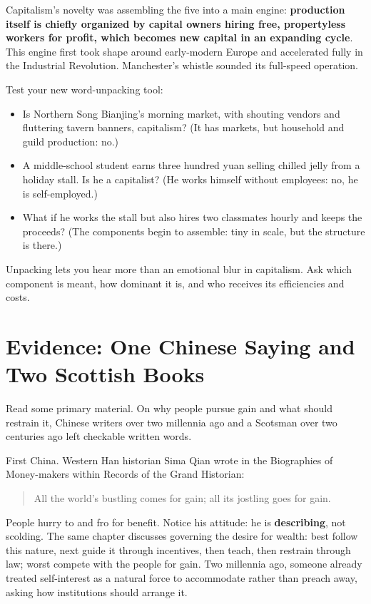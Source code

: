 Capitalism's novelty was assembling the five into a main engine: \textbf{production itself is chiefly organized by capital owners hiring free, propertyless workers for profit, which becomes new capital in an expanding cycle}. This engine first took shape around early-modern Europe and accelerated fully in the Industrial Revolution. Manchester's whistle sounded its full-speed operation.

Test your new word-unpacking tool:

\begin{itemize}
\item Is Northern Song Bianjing's morning market, with shouting vendors and fluttering tavern banners, capitalism? (It has markets, but household and guild production: no.)
\item A middle-school student earns three hundred yuan selling chilled jelly from a holiday stall. Is he a capitalist? (He works himself without employees: no, he is self-employed.)
\item What if he works the stall but also hires two classmates hourly and keeps the proceeds? (The components begin to assemble: tiny in scale, but the structure is there.)
\end{itemize}
Unpacking lets you hear more than an emotional blur in capitalism. Ask which component is meant, how dominant it is, and who receives its efficiencies and costs.

\section[A Chinese Saying and Scottish Books]{Evidence: One Chinese Saying and Two Scottish Books}
Read some primary material. On why people pursue gain and what should restrain it, Chinese writers over two millennia ago and a Scotsman over two centuries ago left checkable written words.

First China. Western Han historian Sima Qian wrote in the Biographies of Money-makers within Records of the Grand Historian:

\begin{quote}
All the world's bustling comes for gain; all its jostling goes for gain.
\end{quote}
People hurry to and fro for benefit. Notice his attitude: he is \textbf{describing}, not scolding. The same chapter discusses governing the desire for wealth: best follow this nature, next guide it through incentives, then teach, then restrain through law; worst compete with the people for gain. Two millennia ago, someone already treated self-interest as a natural force to accommodate rather than preach away, asking how institutions should arrange it.

